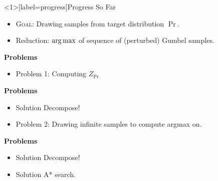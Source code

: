 \begin{frame}<1>[label=progress]{Progress So Far}
  \begin{itemize}[<+->]
  \item \textsc{Goal}: Drawing samples from target distribution $\Pr$.
  \item Reduction: $\operatorname*{{arg\,max}}$ of sequence of (perturbed) Gumbel samples.
  \end{itemize}
  \begin{overprint}

    \textbf{Problems}
    \begin{itemize}
    \item {\color{red}Problem 1:} Computing $Z_{\Pr}$        %
    \end{itemize}

    \textbf{Problems}
    \begin{itemize} 
    \item {\color{blue} Solution} Decompose! %
    \item {\color{red} Problem 2:} Drawing infinite samples to compute argmax on. %
    \end{itemize}

    \textbf{Problems}
    \begin{itemize} 
    \item {\color{blue} Solution} Decompose! %
    \item {\color{blue} Solution} A* search.
    \end{itemize}
  \end{overprint}
\end{frame}


